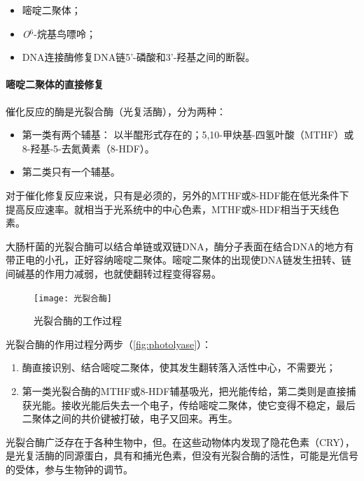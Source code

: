 \begin{itemize}
	\item 嘧啶二聚体；
	\item \textit{O}$^{6}$-烷基鸟嘌呤；
	\item DNA连接酶修复DNA链5'-磷酸和3'-羟基之间的断裂。
\end{itemize}

\paragraph{嘧啶二聚体的直接修复}

催化反应的酶是光裂合酶（光复活酶），分为两种：

\begin{itemize}
	\item 第一类有两个辅基： 以半醌形式存在的；5,10-甲炔基-四氢叶酸（MTHF）或8-羟基-5-去氮黄素（8-HDF）。
	\item 第二类只有一个辅基。
\end{itemize}

对于催化修复反应来说，只有是必须的，另外的MTHF或8-HDF能在低光条件下提高反应速率。就相当于光系统中的中心色素，MTHF或8-HDF相当于天线色素。

大肠杆菌的光裂合酶可以结合单链或双链DNA，酶分子表面在结合DNA的地方有带正电的小孔，正好容纳嘧啶二聚体。嘧啶二聚体的出现使DNA链发生扭转、链间碱基的作用力减弱，也就使翻转过程变得容易。

\begin{figure}
	\centering
	\texttt{[image: 光裂合酶]}
	\caption{光裂合酶的工作过程}
	\label{fig:photolyase}
\end{figure}

光裂合酶的作用过程分两步（\autoref{fig:photolyase}）：\begin{enumerate}
	\item 酶直接识别、结合嘧啶二聚体，使其发生翻转落入活性中心，不需要光；
	\item 第一类光裂合酶的MTHF或8-HDF辅基吸光，把光能传给，第二类则是直接捕获光能。接收光能后失去一个电子，传给嘧啶二聚体，使它变得不稳定，最后二聚体之间的共价键被打破，电子又回来。再生。
\end{enumerate}

光裂合酶广泛存在于各种生物中，但。在这些动物体内发现了隐花色素（CRY），是光复活酶的同源蛋白，具有和捕光色素，但没有光裂合酶的活性，可能是光信号的受体，参与生物钟的调节。

